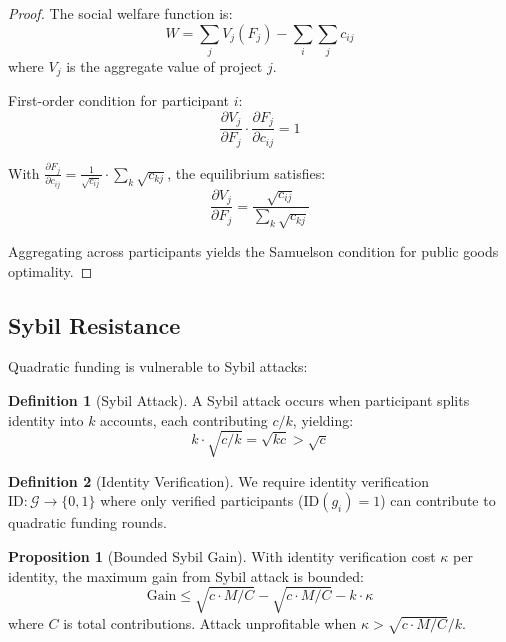 \documentclass[11pt,a4paper]{article}
\theoremstyle{definition}
\newtheorem{definition}{Definition}[section]
\newtheorem{proposition}[theorem]{Proposition}
\theoremstyle{remark}
\begin{document}
\begin{proof}
The social welfare function is:
\begin{equation}
    W = \sum_j V_j(F_j) - \sum_i \sum_j c_{ij}
\end{equation}
where $V_j$ is the aggregate value of project $j$.

First-order condition for participant $i$:
\begin{equation}
    \frac{\partial V_j}{\partial F_j} \cdot \frac{\partial F_j}{\partial c_{ij}} = 1
\end{equation}

With $\frac{\partial F_j}{\partial c_{ij}} = \frac{1}{\sqrt{c_{ij}}} \cdot \sum_k \sqrt{c_{kj}}$, the equilibrium satisfies:
\begin{equation}
    \frac{\partial V_j}{\partial F_j} = \frac{\sqrt{c_{ij}}}{\sum_k \sqrt{c_{kj}}}
\end{equation}

Aggregating across participants yields the Samuelson condition for public goods optimality.
\end{proof}

\subsection{Sybil Resistance}

Quadratic funding is vulnerable to Sybil attacks:

\begin{definition}[Sybil Attack]
A Sybil attack occurs when participant splits identity into $k$ accounts, each contributing $c/k$, yielding:
\begin{equation}
    k \cdot \sqrt{c/k} = \sqrt{kc} > \sqrt{c}
\end{equation}
\end{definition}

\begin{definition}[Identity Verification]
We require identity verification $\text{ID}: \mathcal{G} \to \{0, 1\}$ where only verified participants ($\text{ID}(g_i) = 1$) can contribute to quadratic funding rounds.
\end{definition}

\begin{proposition}[Bounded Sybil Gain]
With identity verification cost $\kappa$ per identity, the maximum gain from Sybil attack is bounded:
\begin{equation}
    \text{Gain} \leq \sqrt{c \cdot M / C} - \sqrt{c \cdot M / C} - k \cdot \kappa
\end{equation}
where $C$ is total contributions. Attack unprofitable when $\kappa > \sqrt{c \cdot M / C} / k$.
\end{proposition}
\end{document}
